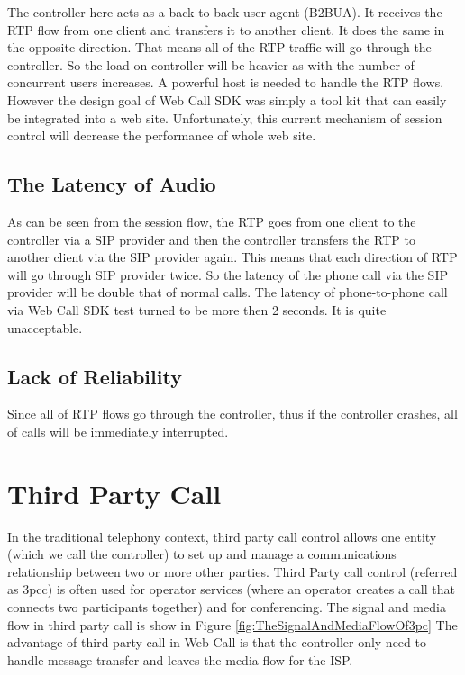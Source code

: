 The controller here acts as a back to back user agent (B2BUA). It receives the RTP flow from one client and transfers it to another client. It does the same in the opposite direction. That means all of the RTP traffic will go through the controller. So the load on controller will be heavier as with the number of concurrent users increases. A powerful host is needed to handle the RTP flows. However the design goal of Web Call SDK was simply a tool kit that can easily be integrated into a web site. Unfortunately, this  current mechanism of session control will decrease the performance of whole web site. 

\subsection{The Latency of Audio}
\label{sec:Solution:ProblemOfRelayCall:TheLatencyOfThePhoneCall}
 
As can be seen from the session flow, the RTP goes from one client to the controller via a SIP provider and then the controller transfers the RTP to another client via the SIP provider again. This means that each direction of RTP will go through SIP provider twice. So the latency of the phone call via the SIP provider will be double that of normal calls.  The latency of phone-to-phone call via Web Call SDK test turned to be more then 2 seconds. It is quite unacceptable. 

\subsection{Lack of Reliability}
\label{sec:Solution:ProblemOfRelayCall:LackOfReliability}

Since all of RTP flows go through the controller, thus if the controller crashes, all of calls will be immediately interrupted. 

\section{Third Party Call}
\label{sec:Solution:ThirdPartyCall}

In the traditional telephony context, third party call control allows one entity (which we call the controller) to set up and manage a communications relationship between two or more other parties. Third Party call control (referred as 3pcc) is often used for operator services (where an operator creates a call that connects two participants together) and for conferencing. The signal and media flow in third party call is show in Figure \ref{fig:TheSignalAndMediaFlowOf3pc} The advantage of third party call in Web Call is that the controller only need to handle message transfer and leaves the media flow for the ISP.

